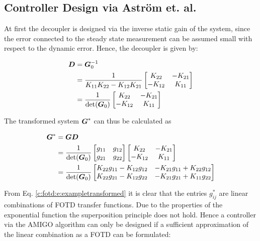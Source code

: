 \subsection{Controller Design via Astr\"om et. al.}
\label{c:fotd:su:astrom}

At first the decoupler is designed via the inverse static gain of the system, since the error connected to the steady state measurement can be assumed small with respect to the dynamic error. Hence, the decoupler is given by:

\begin{align}
\begin{split}
\mbox{\boldmath$D$} &= \mbox{\boldmath$G$}_0^{-1}\\
&= \frac{1}{K_{11}K_{22}-K_{12}K_{21}} 
\begin{bmatrix}
K_{22} & -K_{21} \\
-K_{12} & K_{11}
\end{bmatrix} \\
&= \frac{1}{\det(\mbox{\boldmath$G$}_0)} 
\begin{bmatrix}
K_{22} & -K_{21} \\
-K_{12} & K_{11}
\end{bmatrix}
\end{split}
\label{c:fotd:e:exampleDecoupler}
\end{align}

The transformed system $\mbox{\boldmath$G$}^*$ can thus be calculated as

\begin{align}
\begin{split}
\mbox{\boldmath$G$}^* &= \mbox{\boldmath$G$}\mbox{\boldmath$D$}\\
&= \frac{1}{\det(\mbox{\boldmath$G$}_0)} 
\begin{bmatrix}
g_{11} & g_{12} \\
g_{21} & g_{22}
\end{bmatrix}
\begin{bmatrix}
K_{22} & -K_{21} \\
-K_{12} & K_{11}
\end{bmatrix} \\
&= \frac{1}{\det(\mbox{\boldmath$G$}_0)}
\begin{bmatrix}
K_{22}g_{11}-K_{12}g_{12} & -K_{21}g_{11}+K_{22}g_{12} \\
K_{22}g_{21}-K_{12}g_{22} &
-K_{21}g_{21}+K_{11}g_{22}
\end{bmatrix}
\end{split}
\label{c:fotd:e:exampletransformed}
\end{align}

From Eq. \ref{c:fotd:e:exampletransformed} it is clear that the entries $g_{ij}^*$ are linear combinations of FOTD transfer functions. Due to the properties of the exponential function the superposition principle does not hold. Hence a controller via the AMIGO algorithm can only be designed if a sufficient approximation of the linear combination as a FOTD can be formulated:

